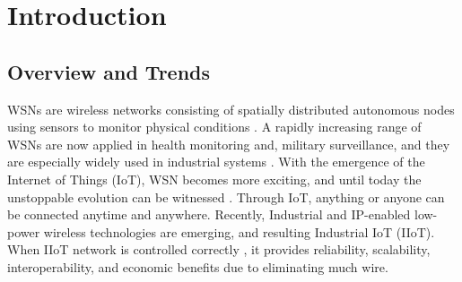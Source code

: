 \chapter{Introduction}

\section{Overview and Trends}
WSNs are wireless networks consisting of spatially distributed autonomous nodes using sensors to monitor physical conditions \cite{6188353, 7299315, LONG201739, Pham2017}.  A rapidly increasing range of WSNs are now applied in health monitoring and, military surveillance, and they are especially widely used in industrial systems \cite{Quang2012, 7273816}. With the emergence of the Internet of Things (IoT), WSN becomes more exciting, and until today the unstoppable evolution can be witnessed \cite{6714496, 7120024}. Through IoT, anything or anyone can be connected anytime and anywhere. Recently, Industrial and IP-enabled low-power wireless technologies are emerging, and resulting Industrial IoT (IIoT). When IIoT network is controlled correctly \cite{998012, KIM20031301}, it provides reliability, scalability, interoperability, and economic benefits due to eliminating much wire. 

